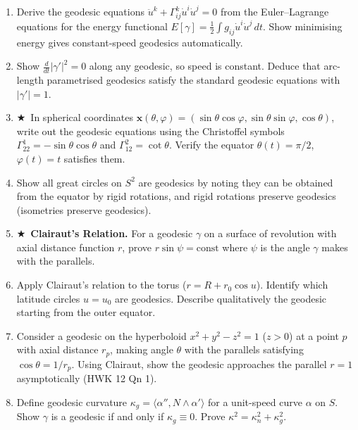 \documentclass[11pt, a4paper]{article}
\newcommand{\kp}{\kappa}
\newcommand{\hard}{$\bigstar$\ }
\begin{document}
\begin{enumerate}[label=\textbf{Q\arabic*.}, leftmargin=*, itemsep=6pt]

\item Derive the geodesic equations $\ddot{u}^k+\Gamma_{ij}^k\dot{u}^i\dot{u}^j=0$ from the Euler--Lagrange equations for the energy functional $E[\gamma]=\frac{1}{2}\int g_{ij}\dot{u}^i\dot{u}^j\,dt$. Show minimising energy gives constant-speed geodesics automatically.

\item Show $\frac{d}{dt}|\gamma'|^2=0$ along any geodesic, so speed is constant. Deduce that arc-length parametrised geodesics satisfy the standard geodesic equations with $|\gamma'|=1$.

\item \hard In spherical coordinates $\mathbf{x}(\theta,\varphi)=(\sin\theta\cos\varphi,\sin\theta\sin\varphi,\cos\theta)$, write out the geodesic equations using the Christoffel symbols $\Gamma_{22}^1=-\sin\theta\cos\theta$ and $\Gamma_{12}^2=\cot\theta$. Verify the equator $\theta(t)=\pi/2$, $\varphi(t)=t$ satisfies them.

\item Show all great circles on $S^2$ are geodesics by noting they can be obtained from the equator by rigid rotations, and rigid rotations preserve geodesics (isometries preserve geodesics).

\item \hard \textbf{Clairaut's Relation.} For a geodesic $\gamma$ on a surface of revolution with axial distance function $r$, prove $r\sin\psi=\text{const}$ where $\psi$ is the angle $\gamma$ makes with the parallels.

\item Apply Clairaut's relation to the torus ($r=R+r_0\cos u$). Identify which latitude circles $u=u_0$ are geodesics. Describe qualitatively the geodesic starting from the outer equator.

\item Consider a geodesic on the hyperboloid $x^2+y^2-z^2=1$ ($z>0$) at a point $p$ with axial distance $r_p$, making angle $\theta$ with the parallels satisfying $\cos\theta=1/r_p$. Using Clairaut, show the geodesic approaches the parallel $r=1$ asymptotically (HWK 12 Qn 1).

\item Define geodesic curvature $\kp_g=\langle\alpha'',N\wedge\alpha'\rangle$ for a unit-speed curve $\alpha$ on $S$. Show $\gamma$ is a geodesic if and only if $\kp_g\equiv 0$. Prove $\kp^2=\kp_n^2+\kp_g^2$.


\end{enumerate}
\end{document}
